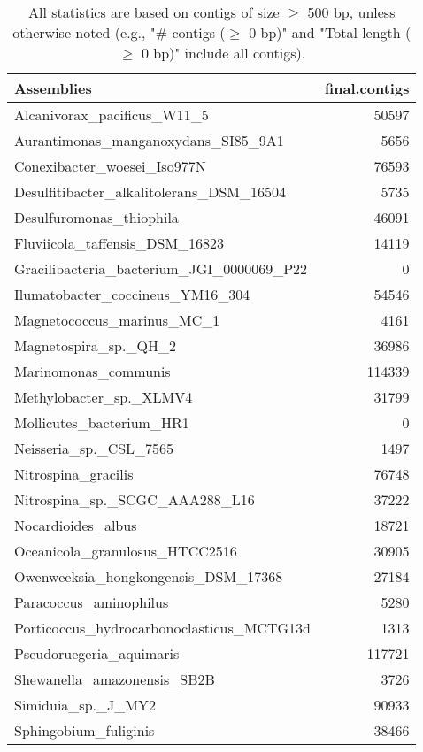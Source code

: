 \documentclass[12pt,a4paper]{article}
\begin{document}
\begin{table}[ht]
\begin{center}
\caption{All statistics are based on contigs of size $\geq$ 500 bp, unless otherwise noted (e.g., "\# contigs ($\geq$ 0 bp)" and "Total length ($\geq$ 0 bp)" include all contigs).}
\begin{tabular}{|l*{1}{|r}|}
\hline
Assemblies & final.contigs \\ \hline
Alcanivorax\_pacificus\_W11\_5 & 50597 \\ \hline
Aurantimonas\_manganoxydans\_SI85\_9A1 & 5656 \\ \hline
Conexibacter\_woesei\_Iso977N & 76593 \\ \hline
Desulfitibacter\_alkalitolerans\_DSM\_16504 & 5735 \\ \hline
Desulfuromonas\_thiophila & 46091 \\ \hline
Fluviicola\_taffensis\_DSM\_16823 & 14119 \\ \hline
Gracilibacteria\_bacterium\_JGI\_0000069\_P22 & 0 \\ \hline
Ilumatobacter\_coccineus\_YM16\_304 & 54546 \\ \hline
Magnetococcus\_marinus\_MC\_1 & 4161 \\ \hline
Magnetospira\_sp.\_QH\_2 & 36986 \\ \hline
Marinomonas\_communis & 114339 \\ \hline
Methylobacter\_sp.\_XLMV4 & 31799 \\ \hline
Mollicutes\_bacterium\_HR1 & 0 \\ \hline
Neisseria\_sp.\_CSL\_7565 & 1497 \\ \hline
Nitrospina\_gracilis & 76748 \\ \hline
Nitrospina\_sp.\_SCGC\_AAA288\_L16 & 37222 \\ \hline
Nocardioides\_albus & 18721 \\ \hline
Oceanicola\_granulosus\_HTCC2516 & 30905 \\ \hline
Owenweeksia\_hongkongensis\_DSM\_17368 & 27184 \\ \hline
Paracoccus\_aminophilus & 5280 \\ \hline
Porticoccus\_hydrocarbonoclasticus\_MCTG13d & 1313 \\ \hline
Pseudoruegeria\_aquimaris & 117721 \\ \hline
Shewanella\_amazonensis\_SB2B & 3726 \\ \hline
Simiduia\_sp.\_J\_MY2 & 90933 \\ \hline
Sphingobium\_fuliginis & 38466 \\ \hline

\end{tabular}
\end{center}
\end{table}
\end{document}
